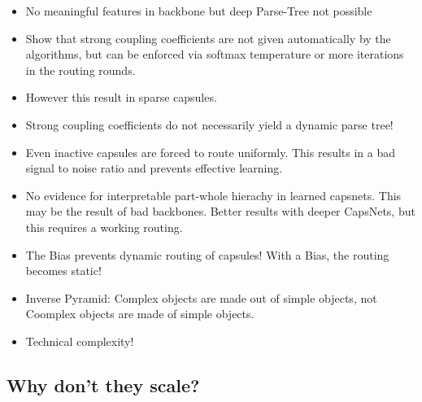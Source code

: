 \documentclass{article}
\begin{document}
\begin{itemize}
	\item No meaningful features in backbone but deep Parse-Tree not possible
	\item Show that strong coupling coefficients are not given automatically by the algorithms, but can be enforced via softmax temperature or more iterations in the routing rounds.
	\item However this result in sparse capsules.
	\item Strong coupling coefficients do not necessarily yield a dynamic parse tree!
	\item Even inactive capsules are forced to route uniformly. This results in a bad signal to noise ratio and prevents effective learning.
	\item No evidence for interpretable part-whole hierachy in learned capsnets. This may be the result of bad backbones. Better results with deeper CapsNets, but this requires a working routing.
	\item The Bias prevents dynamic routing of capsules! With a Bias, the routing becomes static!
	\item Inverse Pyramid: Complex objects are made out of simple objects, not Coomplex objects are made of simple objects.
	\item Technical complexity!
\end{itemize}

\subsection{Why don't they scale?}
\end{document}
